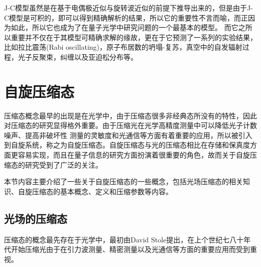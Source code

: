 J-C模型虽然是在基于电偶极近似与旋转波近似的前提下推导出来的，但是由于J-C模型是可积的，即可以得到精确解析的结果，所以它的重要性不言而喻，而正因为如此，所以它也成为了在量子光学中研究问题的一个最基本的模型。
而它之所以重要并不仅在于其模型可精确求解的缘故，更在于它预测了一系列的实验结果，比如拉比震荡(Rabi oscillating)\cite{rabi1937space,cummings2013reminiscing}，原子布居数的坍塌-复苏\cite{rempe1987observation,eberly1980periodic}，真空中的自发辐射过程，光子反聚束\cite{haroche2013nobel,wineland2013nobel}，纠缠\cite{rauschenbeutel2000step,phoenix1991establishment}以及亚迫松分布等。

















\vbox{}
\section{自旋压缩态}
\vbox{}
压缩态概念最早的出现是在光学中，由于压缩态很多非经典态所没有的特性，因此对压缩态的研究显得格外重要。由于压缩光在光学高精度测量中可以降低光子计数噪声、提高非破坏性%
测量的灵敏度和光通信等方面有着重要的应用，所以被引入到自旋系统，称之为自旋压缩态。自旋压缩态与光的压缩态相比在存储和保真度方面更容易实现，而且在量子信息的研究方面扮演着很重要的角色，故而关于自旋压缩态的研究受到了广泛的关注。

本节内容主要介绍了一些关于自旋压缩态的一些概念，包括光场压缩态的相关知识、自旋压缩态的基本概念、定义和压缩参数等内容。

\subsection{光场的压缩态}\label{section31}

压缩态的概念最先存在于光学中，最初由David Stole提出，在上个世纪七八十年代开始压缩光由于在引力波测量、精密测量以及光通信等方面的重要应用而受到重视。

